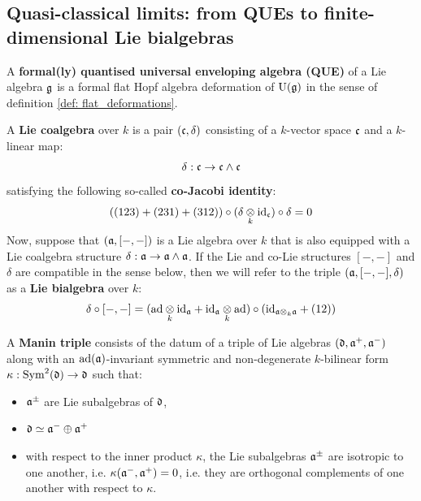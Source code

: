     \subsection{Quasi-classical limits: from QUEs to finite-dimensional Lie bialgebras}
        \begin{definition} \label{def: formal_QUEs}
            A \textbf{formal(ly) quantised universal enveloping algebra (QUE)} of a Lie algebra $\mathfrak{g}$ is a formal flat Hopf algebra deformation of $\mathrm{U}(\mathfrak{g})$ in the sense of definition \ref{def: flat_deformations}.
        \end{definition}
    
        \begin{definition} \label{def: lie_co/bialgebras}
            A \textbf{Lie coalgebra} over $k$ is a pair $(\mathfrak{c}, \delta)$ consisting of a $k$-vector space $\mathfrak{c}$ and a $k$-linear map:
                $$\delta: \mathfrak{c} \to \mathfrak{c} \wedge \mathfrak{c}$$
            satisfying the following so-called \textbf{co-Jacobi identity}:
                $$((123) + (231) + (312)) \circ (\delta \tensor_k \id_\c) \circ \delta = 0$$
            Now, suppose that $(\mathfrak{a}, [-, -])$ is a Lie algebra over $k$ that is also equipped with a Lie coalgebra structure $\delta: \mathfrak{a} \to \mathfrak{a} \wedge \mathfrak{a}$. If the Lie and co-Lie structures $[-, -]$ and $\delta$ are compatible in the sense below, then we will refer to the triple $(\mathfrak{a}, [-, -], \delta)$ as a \textbf{Lie bialgebra} over $k$:
                $$\delta \circ [-, -] = (\ad \tensor_k \id_{\a} + \id_{\a} \tensor_k \ad) \circ (\id_{\a \tensor_k \a} + (12))$$
        \end{definition}
        \begin{definition} \label{def: manin_triples}
            A \textbf{Manin triple} consists of the datum of a triple of Lie algebras $(\mathfrak{d}, \mathfrak{a}^+, \mathfrak{a}^-)$ along with an $\mathrm{ad}(\mathfrak{a})$-invariant symmetric and non-degenerate $k$-bilinear form $\kappa: \operatorname{Sym}^2(\mathfrak{d}) \to \mathfrak{d}$ such that:
                \begin{itemize}
                    \item $\mathfrak{a}^{\pm}$ are Lie subalgebras of $\mathfrak{d}$,
                    \item $\mathfrak{d} \simeq \mathfrak{a}^- \oplus \mathfrak{a}^+$
                    \item with respect to the inner product $\kappa$, the Lie subalgebras $\mathfrak{a}^{\pm}$ are isotropic to one another, i.e. $\kappa(\mathfrak{a}^-, \mathfrak{a}^+) = 0$, i.e. they are orthogonal complements of one another with respect to $\kappa$.
                \end{itemize}
        \end{definition}
